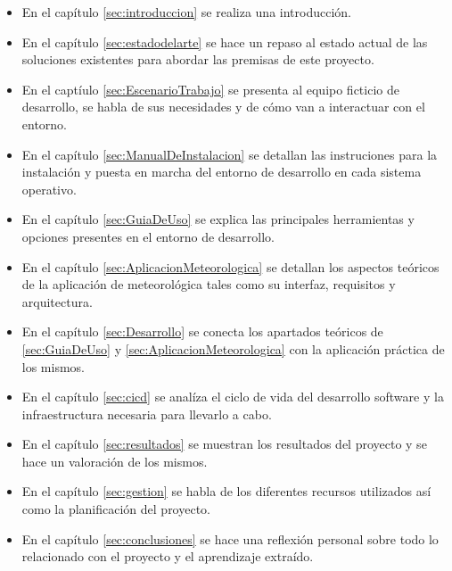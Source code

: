 \begin{itemize}
\item En el capítulo \ref{sec:introduccion} se realiza una introducción.
\item En el capítulo \ref{sec:estadodelarte} se hace un repaso al estado actual de las
soluciones existentes para abordar las premisas de este proyecto.
\item En el captíulo \ref{sec:EscenarioTrabajo} se presenta al equipo ficticio de
desarrollo, se habla de sus necesidades y de cómo van a interactuar con el entorno.
\item En el capítulo \ref{sec:ManualDeInstalacion} se detallan las instruciones para la
instalación y puesta en marcha del entorno de desarrollo en cada sistema operativo.
\item En el capítulo \ref{sec:GuiaDeUso} se explica las principales herramientas y
opciones presentes en el entorno de desarrollo.
\item En el capítulo \ref{sec:AplicacionMeteorologica} se detallan los aspectos teóricos
de la aplicación de meteorológica tales como su interfaz, requisitos y arquitectura.
\item En el capítulo \ref{sec:Desarrollo} se conecta los apartados teóricos de \ref{sec:GuiaDeUso}
y \ref{sec:AplicacionMeteorologica} con la aplicación práctica de los mismos.
\item En el capítulo \ref{sec:cicd} se analíza el ciclo de vida del desarrollo software
y la infraestructura necesaria para llevarlo a cabo.
\item En el capítulo \ref{sec:resultados} se muestran los resultados del proyecto y se
hace un valoración de los mismos.
\item En el capítulo \ref{sec:gestion} se habla de los diferentes recursos utilizados
así como la planificación del proyecto.
\item En el capítulo \ref{sec:conclusiones} se hace una reflexión personal sobre todo
lo relacionado con el proyecto y el aprendizaje extraído.
\end{itemize}

